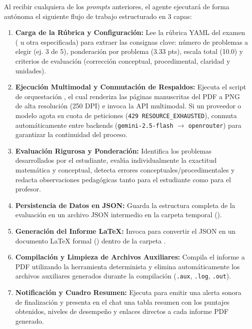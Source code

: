\documentclass[12pt,letterpaper]{article}
\begin{document}
\begin{autobox}
Al recibir cualquiera de los \textit{prompts} anteriores, el agente ejecutará de forma autónoma el siguiente flujo de trabajo estructurado en 3 capas:

\begin{enumerate}[leftmargin=*]
    \item \textbf{Carga de la Rúbrica y Configuración:}
    Lee la rúbrica YAML del examen ( u otra especificada) para extraer las consignas clave: número de problemas a elegir (ej. 3 de 5), ponderación por problema (3.33 pts), escala total (10.0) y criterios de evaluación (corrección conceptual, procedimental, claridad y unidades).

    \item \textbf{Ejecución Multimodal y Conmutación de Respaldos:}
    Ejecuta el script de orquestación , el cual renderiza las páginas manuscritas del PDF a PNG de alta resolución (250 DPI) e invoca la API multimodal. Si un proveedor o modelo agota su cuota de peticiones (\texttt{429 RESOURCE\_EXHAUSTED}), conmuta automáticamente entre backends (\texttt{gemini-2.5-flash} $\rightarrow$ \texttt{openrouter}) para garantizar la continuidad del proceso.

    \item \textbf{Evaluación Rigurosa y Ponderación:}
    Identifica los problemas desarrollados por el estudiante, evalúa individualmente la exactitud matemática y conceptual, detecta errores conceptuales/procedimentales y redacta observaciones pedagógicas tanto para el estudiante como para el profesor.

    \item \textbf{Persistencia de Datos en JSON:}
    Guarda la estructura completa de la evaluación en un archivo JSON intermedio en la carpeta temporal ().

    \item \textbf{Generación del Informe LaTeX:}
    Invoca  para convertir el JSON en un documento LaTeX formal () dentro de la carpeta .

    \item \textbf{Compilación y Limpieza de Archivos Auxiliares:}
    Compila el informe a PDF utilizando la herramienta determinista  y elimina automáticamente los archivos auxiliares generados durante la compilación (\texttt{.aux}, \texttt{.log}, \texttt{.out}).

    \item \textbf{Notificación y Cuadro Resumen:}
    Ejecuta  para emitir una alerta sonora de finalización y presenta en el chat una tabla resumen con los puntajes obtenidos, niveles de desempeño y enlaces directos a cada informe PDF generado.
\end{enumerate}
\end{autobox}
\end{document}
